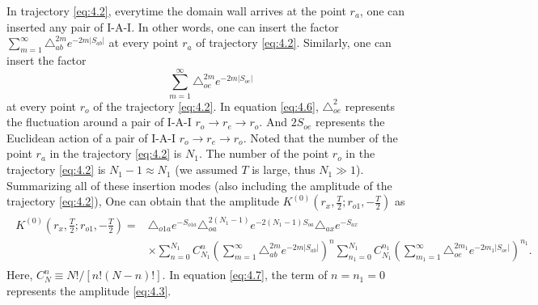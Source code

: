 \documentclass[12pt]{article}
\begin{document}
In trajectory \eqref{eq:4.2}, everytime the domain wall \uppercase\expandafter{} arrives at the point $r_{a}$, one can inserted any pair of I-A-I. In other words, one can insert the factor $\sum_{m=1}^{\infty}\triangle_{ab}^{2m}e^{-2m|S_{ab}|}$ at every point $r_{a}$ of trajectory \eqref{eq:4.2}.
Similarly, one can insert the factor
\begin{equation}
\label{eq:4.6}%
\sum_{m=1}^{\infty}\triangle_{oe}^{2m}e^{-2m|S_{oe}|}
\end{equation}
at every point $r_{o}$ of the trajectory \eqref{eq:4.2}. In equation \eqref{eq:4.6}, $\triangle_{oe}^{2}$ represents the fluctuation around a pair of I-A-I  $r_{o}\rightarrow r_{e}\rightarrow r_{o}$. And $2S_{oe}$ represents the Euclidean action of a pair of I-A-I  $r_{o}\rightarrow r_{e}\rightarrow r_{o}$. Noted that the number of the point $r_{a}$ in the trajectory \eqref{eq:4.2} is $N_{1}$. The number of the point $r_{o}$ in the trajectory \eqref{eq:4.2} is $N_{1}-1\approx N_{1}$ (we assumed $T$ is large, thus $N_{1}\gg1$).
Summarizing all of these  insertion modes (also including the amplitude of the trajectory \eqref{eq:4.2}), One can obtain that the amplitude $K^{(0)}(r_{x},\frac{T}{2}; r_{o1}, -\frac{T}{2})$ as
\begin{eqnarray}\begin{split}
\label{eq:4.7}%
K^{(0)}(r_{x},\frac{T}{2}; r_{o1}, -\frac{T}{2})=&\triangle_{o1a}e^{-S_{o1a}}\triangle_{oa}^{2(N_{1}-1)}e^{-2(N_{1}-1)S_{oa}}\triangle_{ax}e^{-S_{ax}}\\&\times\sum_{n=0}^{N_{1}}C_{N_{1}}^{n}
(\sum_{m=1}^{\infty}\triangle_{ab}^{2m}e^{-2m|S_{ab}|})^{n}\sum_{n_{1}=0}^{N_{1}}C_{N_{1}}^{n_{1}}(\sum_{m_{1}=1}^{\infty}\triangle_{oe}^{2m_{1}}e^{-2m_{1}|S_{oe}|})^{n_{1}}.
\end{split}
\end{eqnarray}
Here, $C_{N}^{n}\equiv N!/[n!(N-n)!]$. In equation \eqref{eq:4.7}, the term of $n=n_{1}=0$ represents the amplitude \eqref{eq:4.3}.
\end{document}
